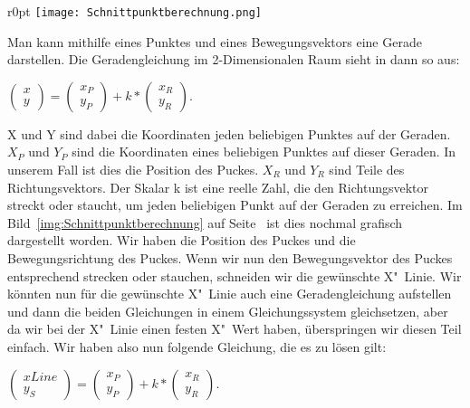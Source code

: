 \begin{wrapfigure}{r}{0pt}
	\vspace{-45pt}
	\texttt{[image: Schnittpunktberechnung.png]}
	\vspace{-15pt}
	\caption{Veranschaulichung der Schnitt"-punkt"-be"-rechnung}
	\vspace{-60pt}
	\label{img:Schnittpunktberechnung}
\end{wrapfigure}

Man kann mithilfe eines Punktes und eines Bewegungsvektors eine Gerade darstellen. Die Geradengleichung im 2-Dimensionalen Raum sieht in dann so aus: 

$\left(\begin{array}{c} x \\ y \end{array}\right) = \left(\begin{array}{c} x_P \\ y_P \end{array}\right) + k * \left(\begin{array}{c} x_R \\ y_R \end{array}\right)$. 

X und Y sind dabei die Koordinaten jeden beliebigen Punktes auf der Geraden. $X_P$ und $Y_P$ sind die Koordinaten eines beliebigen Punktes auf dieser Geraden. In unserem Fall ist dies die Position des Puckes. $X_R$ und $Y_R$ sind Teile des Richtungsvektors. Der Skalar k ist eine reelle Zahl, die den Richtungsvektor streckt oder staucht, um jeden beliebigen Punkt auf der Geraden zu erreichen. Im Bild~\ref{img:Schnittpunktberechnung} auf Seite~\pageref{img:Schnittpunktberechnung} ist dies nochmal grafisch dargestellt worden. Wir haben die Position des Puckes und die Bewegungsrichtung des Puckes. Wenn wir nun den Bewegungsvektor des Puckes entsprechend strecken oder stauchen, schneiden wir die gewünschte X"~Linie. Wir könnten nun für die gewünschte X"~Linie auch eine Geradengleichung aufstellen und dann die beiden Gleichungen in einem Gleichungssystem gleichsetzen, aber da wir bei der X"~Linie einen festen X"~Wert haben, überspringen wir diesen Teil einfach. Wir haben also nun folgende Gleichung, die es zu lösen gilt: 

$\left(\begin{array}{c} xLine \\ y_S \end{array}\right) = \left(\begin{array}{c} x_P \\ y_P \end{array}\right) + k * \left(\begin{array}{c} x_R \\ y_R \end{array}\right)$. 

